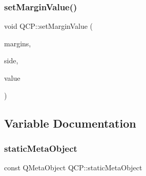 \mbox{\label{namespace_q_c_p_afbf6e3084c108f2bb4372107945ee82f}} 
\subsubsection{\texorpdfstring{setMarginValue()}{setMarginValue()}}
{\footnotesize\ttfamily void Q\+C\+P\+::set\+Margin\+Value (\begin{DoxyParamCaption}\item[{Q\+Margins \&}]{margins,  }\item[{\mbox{\hyperlink{namespace_q_c_p_a7e487e3e2ccb62ab7771065bab7cae54}{Q\+C\+P\+::\+Margin\+Side}}}]{side,  }\item[{int}]{value }\end{DoxyParamCaption})\hspace{0.3cm}{\ttfamily [inline]}}



\subsection{Variable Documentation}
\mbox{\label{namespace_q_c_p_a07ffa1eb1537a3b1f218ff2a442b2017}} 
\subsubsection{\texorpdfstring{staticMetaObject}{staticMetaObject}}
{\footnotesize\ttfamily const Q\+Meta\+Object Q\+C\+P\+::static\+Meta\+Object}

